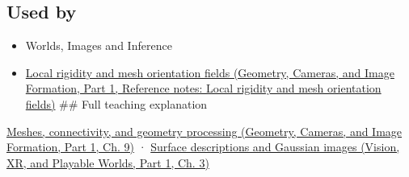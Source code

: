 \subsection{Used by}\label{appendix-0234ab7f86b1-used-by}

\hypertarget{appendix-0234ab7f86b1-used-by}{}

\begin{itemize}
\item
  {Worlds, Images and Inference}
\item
  \href{../03-Geometry-Cameras-and-Image-Formation-P01/main.pdf\#nameddest=appendix-7107009c505b}{Local rigidity and mesh orientation fields (Geometry, Cameras, and Image Formation, Part 1, Reference notes: Local rigidity and mesh orientation fields)} \#\# Full teaching explanation
\end{itemize}

\href{../03-Geometry-Cameras-and-Image-Formation-P01/main.pdf\#nameddest=03-visual-computing-i-ch002-meshes-connectivity-and-geometry-processing}{Meshes, connectivity, and geometry processing (Geometry, Cameras, and Image Formation, Part 1, Ch. 9)} · \href{../07-Vision-XR-and-Playable-Worlds-P01/main.pdf\#nameddest=04-visual-computing-ii-ch032-surface-descriptions-and-gaussian-images}{Surface descriptions and Gaussian images (Vision, XR, and Playable Worlds, Part 1, Ch. 3)}
